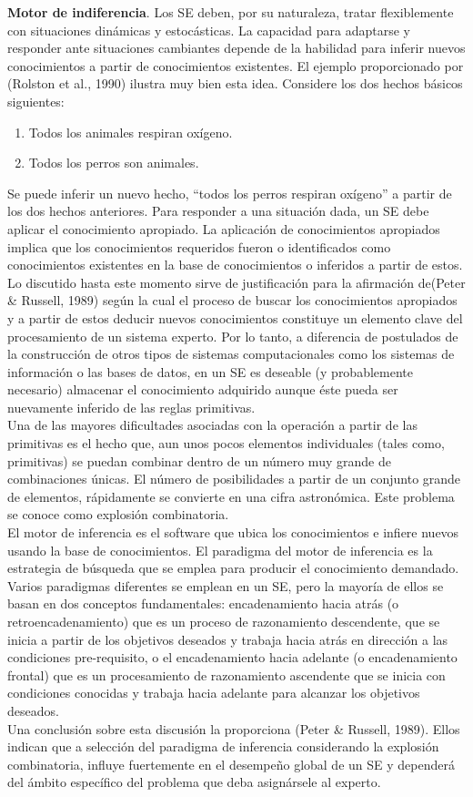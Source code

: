 \textbf{Motor de indiferencia}. Los SE deben, por su naturaleza, tratar flexiblemente con situaciones dinámicas y estocásticas. La capacidad para adaptarse y  responder ante situaciones cambiantes depende de la habilidad para inferir nuevos conocimientos a partir de conocimientos existentes.  El ejemplo proporcionado por (Rolston et al., 1990) ilustra muy bien esta idea. Considere los dos hechos básicos siguientes:
\begin{enumerate}
\item Todos los animales respiran oxígeno.
\item Todos los perros son animales.
\end{enumerate}
Se puede inferir un nuevo hecho, “todos los perros respiran oxígeno” a partir de los dos hechos anteriores. Para responder a una situación dada, un SE debe aplicar el conocimiento apropiado. La aplicación de conocimientos apropiados implica que los conocimientos requeridos fueron o identificados como conocimientos existentes en la base de conocimientos o inferidos a partir de estos.\\
Lo discutido hasta este momento sirve de justificación para la afirmación de(Peter \& Russell, 1989) según la cual el proceso de buscar los conocimientos apropiados y a partir de estos deducir nuevos conocimientos constituye un elemento clave del procesamiento de un sistema experto.  Por lo tanto, a diferencia de postulados de la construcción de otros tipos de sistemas computacionales como los sistemas de información o las bases de datos, en un SE es deseable (y probablemente necesario) almacenar el conocimiento adquirido aunque éste pueda ser nuevamente inferido de las reglas primitivas.\\
Una de las mayores dificultades asociadas con la operación a partir de las primitivas es el hecho que, aun unos pocos elementos individuales (tales como, primitivas)  se puedan combinar dentro de un número muy grande de combinaciones únicas. El número de posibilidades a partir de un conjunto grande de elementos, rápidamente se convierte en una cifra astronómica. Este problema se conoce como explosión combinatoria. \\
El motor de inferencia es el software que ubica los conocimientos e infiere nuevos usando la base de conocimientos. El paradigma del motor de inferencia es la estrategia de búsqueda que se emplea para producir el conocimiento demandado. Varios paradigmas diferentes se emplean en un SE, pero la mayoría de ellos se basan en dos conceptos fundamentales: encadenamiento hacia atrás (o retroencadenamiento) que es un proceso de razonamiento descendente, que se inicia a partir de los objetivos deseados y trabaja hacia atrás en dirección a las condiciones pre-requisito, o el encadenamiento hacia adelante (o encadenamiento frontal) que es un procesamiento de razonamiento ascendente que se inicia con condiciones conocidas y trabaja hacia adelante para alcanzar los objetivos deseados.\\
Una conclusión sobre esta discusión la proporciona (Peter & Russell, 1989).  Ellos indican que a selección del paradigma de inferencia considerando la explosión combinatoria, influye fuertemente en el desempeño global de un SE y dependerá del ámbito específico del problema que deba asignársele al experto. \\
